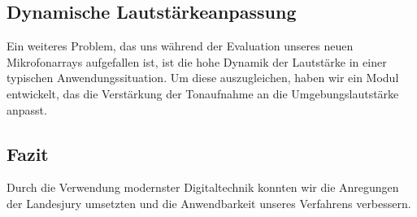 \documentclass[german,10pt,a4paper,notitlepage,twocolumn]{article}
\begin{document}
\subsection*{Dynamische Lautstärkeanpassung}
Ein weiteres Problem, das uns während der Evaluation unseres neuen Mikrofonarrays aufgefallen ist, ist die hohe Dynamik der Lautstärke in einer typischen Anwendungssituation. Um diese auszugleichen, haben wir ein Modul entwickelt, das die Verstärkung der Tonaufnahme an die Umgebungslautstärke anpasst.
\subsection*{Fazit}
Durch die Verwendung modernster Digitaltechnik konnten wir die Anregungen der Landesjury umsetzten und die Anwendbarkeit unseres Verfahrens verbessern.
\vspace{-100pt}
\end{document}
